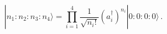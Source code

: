 \begin{equation}
|n_1:n_2:n_3:n_4\rangle =\prod_{i=1}^{4}\frac{1}{\sqrt{n_i!}} 
(a^{\dagger}_i)^{n_i}|0:0:0:0\rangle\,.\label{eq:5.8}
\end{equation}

